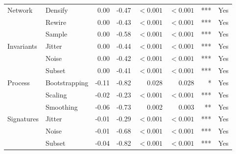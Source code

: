 \documentclass{article}
\begin{document}
\begin{table}[H]
\begin{tabularx}{\linewidth}{@{}l>{\raggedright\arraybackslash}Xrrrrrr@{}}
\midrule
Network & Densify & 0.00 & -0.47 & $<0.001$ & $<0.001$ & *** & Yes \\
 & Rewire & 0.00 & -0.43 & $<0.001$ & $<0.001$ & *** & Yes \\
 & Sample & 0.00 & -0.58 & $<0.001$ & $<0.001$ & *** & Yes \\
\addlinespace
Invariants & Jitter & 0.00 & -0.44 & $<0.001$ & $<0.001$ & *** & Yes \\
 & Noise & 0.00 & -0.42 & $<0.001$ & $<0.001$ & *** & Yes \\
 & Subset & 0.00 & -0.41 & $<0.001$ & $<0.001$ & *** & Yes \\
\addlinespace
Process & Bootstrapping & -0.11 & -0.82 & 0.028 & 0.028 & * & Yes \\
 & Scaling & -0.02 & -0.23 & $<0.001$ & $<0.001$ & *** & Yes \\
 & Smoothing & -0.06 & -0.73 & 0.002 & 0.003 & ** & Yes \\
\addlinespace
Signatures & Jitter & -0.01 & -0.29 & $<0.001$ & $<0.001$ & *** & Yes \\
 & Noise & -0.01 & -0.68 & $<0.001$ & $<0.001$ & *** & Yes \\
 & Subset & -0.04 & -0.82 & $<0.001$ & $<0.001$ & *** & Yes \\
\bottomrule
\end{tabularx}
\par\vspace{12pt}
\begin{minipage}{\linewidth}
\footnotesize

\end{minipage}
\end{table}
\end{document}
